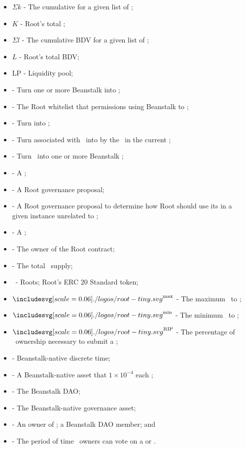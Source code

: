 \documentclass[class=article, crop=false]{standalone}
\begin{document}
\begin{itemize}[topsep=0pt, itemsep=3pt,leftmargin=16pt]
    \item[] $\Sigma k$ - The cumulative  for a given list of  ;
    \item[] $K$ - Root's total ;
    \item[] $\Sigma l$ - The cumulative BDV for a given list of  ;
    \item[] $L$ - Root's total BDV;
    \item[] LP - Liquidity pool;
    \item[]  - Turn one or more Beanstalk   into \Root;
    \item[]   - The Root whitelist that permissions using Beanstalk   to  \Root;
    \item[]  - Turn   into ;
    \item[]  - Turn   associated with  \Bean\ into  by  the  \Bean\ in the current ;
    \item[]  - Turn \Root\ into one or more Beanstalk  ;
    \item[]  - A ;
    \item[]  - A Root governance proposal;
    \item[]  - A Root governance proposal to determine how Root should use its  in a given instance unrelated to ;
    \item[]  - A ;
    \item[]  - The owner of the Root contract;
    \item[] \term{$\rho$} - The total \Root\ supply;
    \item[] \Root\ - Roots; Root's ERC 20 Standard token;
    \item[] $\Root^{\text{max}}$ - The maximum \Root\ to ;
    \item[] $\Root^{\text{min}}$ - The minimum \Root\ to ;
    \item[] $\Root^{\text{RIP}}$ - The percentage of \Root\ ownership necessary to submit a ;
    \item[]  - Beanstalk-native discrete time;
    \item[]  - A Beanstalk-native asset that  $1 \times 10^{-4}$  each ;
    \item[]  - The Beanstalk DAO;
    \item[]  - The Beanstalk-native governance asset;
    \item[]  - An owner of ; a Beanstalk DAO member; and
    \item[]  - The period of time \Root\ owners can vote on a  or .
\end{itemize}
\end{document}
